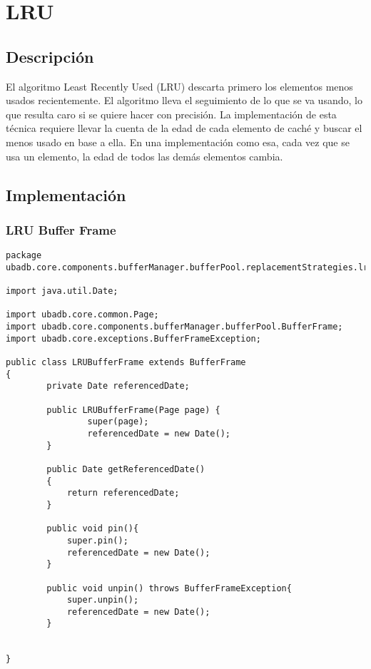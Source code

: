 \section{LRU}

\subsection{Descripción}

El algoritmo Least Recently Used (LRU) descarta primero los elementos menos usados recientemente. El algoritmo lleva el seguimiento de lo que se va usando, lo que resulta caro si se quiere hacer con precisión. La implementación de esta técnica requiere llevar la cuenta de la edad de cada elemento de caché y buscar el menos usado en base a ella. En una implementación como esa, cada vez que se usa un elemento, la edad de todos las demás elementos cambia.

\subsection{Implementación}

\subsubsection{LRU Buffer Frame}

\begin{lstlisting}
package ubadb.core.components.bufferManager.bufferPool.replacementStrategies.lru;

import java.util.Date;

import ubadb.core.common.Page;
import ubadb.core.components.bufferManager.bufferPool.BufferFrame;
import ubadb.core.exceptions.BufferFrameException;

public class LRUBufferFrame extends BufferFrame 
{                
		private Date referencedDate;
	
        public LRUBufferFrame(Page page) {
                super(page);     
                referencedDate = new Date();
        }
        
        public Date getReferencedDate()
    	{
    		return referencedDate;
    	}
        
        public void pin(){
        	super.pin();
        	referencedDate = new Date();
        }
        
        public void unpin() throws BufferFrameException{
        	super.unpin();
        	referencedDate = new Date();
        }


}
\end{lstlisting}

